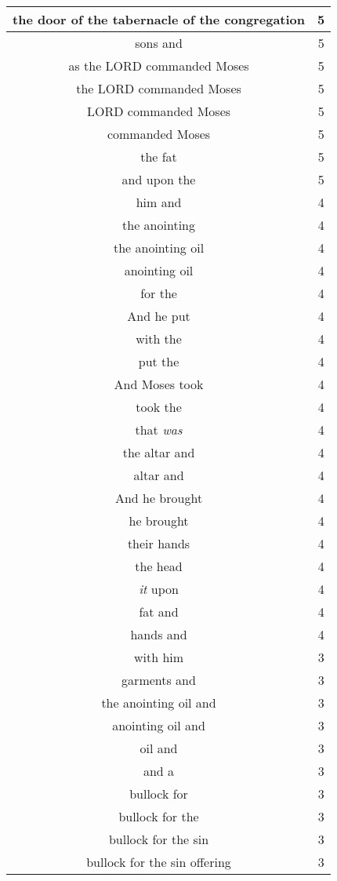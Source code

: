 \begin{center}
\begin{longtable}{|c|c|}
the door of the tabernacle of the congregation & 5\\ \hline 

sons and & 5\\ \hline 
as the LORD commanded Moses & 5\\ \hline 
the LORD commanded Moses & 5\\ \hline 
LORD commanded Moses & 5\\ \hline 
commanded Moses & 5\\ \hline 
the fat & 5\\ \hline 
and upon the & 5\\ \hline 
him and & 4\\ \hline 
the anointing & 4\\ \hline 
the anointing oil & 4\\ \hline 
anointing oil & 4\\ \hline 
for the & 4\\ \hline 
And he put & 4\\ \hline 
with the & 4\\ \hline 
put the & 4\\ \hline 
And Moses took & 4\\ \hline 
took the & 4\\ \hline 
that \emph{was} & 4\\ \hline 
the altar and & 4\\ \hline 
altar and & 4\\ \hline 
And he brought & 4\\ \hline 
he brought & 4\\ \hline 
their hands & 4\\ \hline 
the head & 4\\ \hline 
\emph{it} upon & 4\\ \hline 
fat and & 4\\ \hline 
hands and & 4\\ \hline 
with him & 3\\ \hline 
garments and & 3\\ \hline 
the anointing oil and & 3\\ \hline 
anointing oil and & 3\\ \hline 
oil and & 3\\ \hline 
and a & 3\\ \hline 
bullock for & 3\\ \hline 
bullock for the & 3\\ \hline 
bullock for the sin & 3\\ \hline 
bullock for the sin offering & 3\\ \hline 

\end{longtable}
\end{center}
